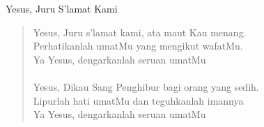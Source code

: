 \begin{center}
Yesus, Juru S'lamat Kami
\end{center}

\begin{verse}
Yesus, Juru s'lamat kami, ata maut Kau menang.\\
Perhatikanlah umatMu yang mengikut wafatMu.\\
Ya Yesus, dengarkanlah seruan umatMu\\
{~}\\
Yesus, Dikau Sang Penghibur bagi orang yang sedih.\\
Lipurlah hati umatMu dan teguhkanlah imannya\\
Ya Yesus, dengarkanlah seruan umatMu\\
\end{verse}